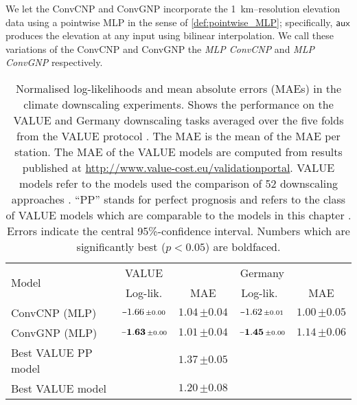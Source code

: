 \documentclass[12pt, twoside]{report}
\begin{document}
We let the ConvCNP and ConvGNP incorporate the \SI{1}{km}--resolution elevation data using a pointwise MLP in the sense of \cref{def:pointwise_MLP};
specifically, $\mathsf{aux}$ produces the elevation at any input using bilinear interpolation.
We call these variations of the ConvCNP and ConvGNP the \emph{MLP ConvCNP} and \emph{MLP ConvGNP} respectively.

\begin{table}[t]
    \centering
    \caption[
        Results for the climate downscaling experiments
    ]{
        Normalised log-likelihoods and mean absolute errors (MAEs) in the climate downscaling experiments.
        Shows the performance on the VALUE and Germany downscaling tasks averaged over the five folds from the VALUE protocol \parencite{Maraun:2015:VALUE_A_Framework_to_Validate}.
        The MAE is the mean of the MAE per station.
        The MAE of the VALUE models are computed from results published at \url{http://www.value-cost.eu/validationportal}.
        VALUE models refer to the models used the comparison of 52 downscaling approaches \parencite[\url{http://www.value-cost.eu};][]{Maraun:2015:VALUE_A_Framework_to_Validate,Gutirrez:2019:An_Intercomparison_of_a_Large}.
        ``PP'' stands for perfect prognosis and refers to the class of VALUE models which are comparable to the models in this chapter \parencite{Maraun:2010:Precipitation_Downscaling_Under_Climate_Change}.
        Errors indicate the central 95\%-confidence interval.
        Numbers which are significantly best ($p < 0.05$) are boldfaced.
    }
    \label{tab:climate_downscaling_results}
    \small
    \begin{tabular}{lcccc}
        \toprule
        \multirow{2}{*}{Model} & VALUE & & Germany &  \\
                               & Log-lik. & MAE & Log-lik.~\hspace{2pt} & MAE \\
        \midrule
        ConvCNP (MLP)
            & $\shortminus 1.66 \, {\scriptstyle \pm 0.00}$
            & $\mathbf{1.04} \, {\scriptstyle \pm 0.04}$
            & $\shortminus 1.62 \, {\scriptstyle \pm 0.01}$
            & $\mathbf{1.00} \, {\scriptstyle \pm 0.05}$ \\
        ConvGNP (MLP)
            & $\mathbf{\shortminus 1.63} \, {\scriptstyle \pm 0.00}$
            & $\mathbf{1.01} \, {\scriptstyle \pm 0.04}$
            & $\mathbf{\shortminus 1.45} \, {\scriptstyle \pm 0.00}$
            & $1.14 \, {\scriptstyle \pm 0.06}$ \\
        Best VALUE PP model
            &
            & $1.37 \, {\scriptstyle \pm 0.05}$ \\
        Best VALUE model
            &
            & $1.20 \, {\scriptstyle \pm 0.08}$ \\
        \bottomrule
    \end{tabular}
\end{table}
\end{document}
